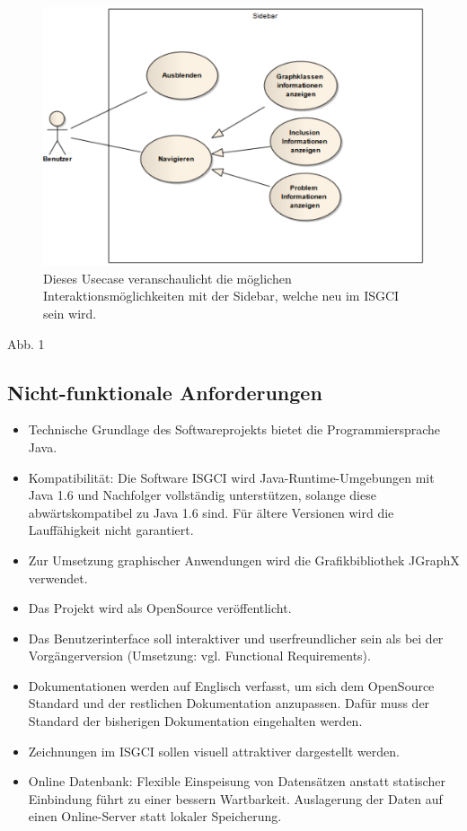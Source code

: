 \documentclass[11pt,a4paper]{article}
\begin{document}
\newpage
\begin{figure}[htp]
	\begin{center}
		\includegraphics[width=13cm]{Sidebar.PNG}	
	\end{center}
	\caption{Dieses Usecase veranschaulicht die möglichen Interaktionsmöglichkeiten mit der Sidebar, welche neu im ISGCI sein wird.}
	\label{fig:figure1}
\end{figure}
\newpage
\hspace*{10.7cm} Abb. 1

	
	\subsection{Nicht-funktionale Anforderungen} %
		\begin{itemize}
		\item Technische Grundlage des Softwareprojekts bietet die Programmiersprache Java.
		\item Kompatibilität: Die Software ISGCI wird Java-Runtime-Umgebungen mit Java 1.6 und Nachfolger vollständig unterstützen, solange diese abwärtskompatibel zu Java 1.6 sind. Für ältere Versionen wird die Lauffähigkeit nicht garantiert.
		\item Zur Umsetzung graphischer Anwendungen wird die Grafikbibliothek JGraphX verwendet.
		\item Das Projekt wird als OpenSource veröffentlicht.
		\item Das Benutzerinterface soll interaktiver und userfreundlicher sein als bei der Vorgängerversion (Umsetzung: vgl. Functional Requirements).
		\item Dokumentationen werden auf Englisch verfasst, um sich dem OpenSource Standard und der restlichen Dokumentation anzupassen. Dafür muss der Standard der bisherigen Dokumentation eingehalten werden.
		\item Zeichnungen im ISGCI sollen visuell attraktiver dargestellt werden.
		\item Online Datenbank: Flexible Einspeisung von Datensätzen anstatt statischer Einbindung führt zu einer bessern Wartbarkeit. Auslagerung der Daten auf einen Online-Server statt lokaler Speicherung.
		\end{itemize}
		
\end{document}
